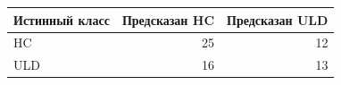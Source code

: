 \begin{center}
\begin{tabular}{lrr}
\toprule
Истинный класс & Предсказан HC & Предсказан ULD \\
\midrule
HC & 25 & 12 \\
ULD & 16 & 13 \\
\bottomrule
\end{tabular}
\end{center}
